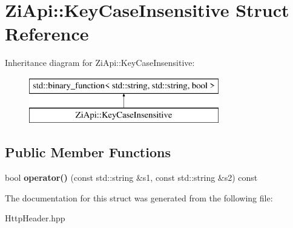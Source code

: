 \hypertarget{structZiApi_1_1KeyCaseInsensitive}{}\section{Zi\+Api\+::Key\+Case\+Insensitive Struct Reference}
\label{structZiApi_1_1KeyCaseInsensitive}
Inheritance diagram for Zi\+Api\+::Key\+Case\+Insensitive\+:\begin{figure}[H]
\begin{center}
\leavevmode
\includegraphics[height=2.000000cm]{structZiApi_1_1KeyCaseInsensitive}
\end{center}
\end{figure}
\subsection*{Public Member Functions}
\begin{DoxyCompactItemize}
\item 
\mbox{\label{structZiApi_1_1KeyCaseInsensitive_aa22a6086feadffdf76e11f2c839206b1}} 
bool {\bfseries operator()} (const std\+::string \&s1, const std\+::string \&s2) const
\end{DoxyCompactItemize}


The documentation for this struct was generated from the following file\+:\begin{DoxyCompactItemize}
\item 
Http\+Header.\+hpp\end{DoxyCompactItemize}
